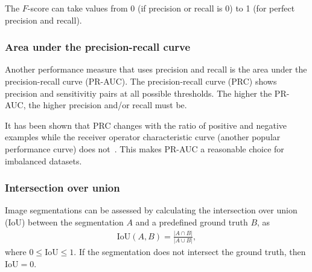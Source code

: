 The $F$-score can take values from 0 (if precision or recall is 0) to 1 (for perfect precision and recall).

\subsubsection{Area under the precision-recall curve}
Another performance measure that uses precision and recall is the area under the precision-recall curve (PR-AUC).
The precision-recall curve (PRC) shows precision and sensitivitiy pairs at all possible thresholds.
The higher the PR-AUC, the higher precision and/or recall must be.

It has been shown that PRC changes with the ratio of positive and negative examples while the receiver operator characteristic curve (another popular performance curve) does not~\cite{Takaya2015}.
This makes PR-AUC a reasonable choice for imbalanced datasets.

\subsubsection{Intersection over union}
Image segmentations can be assessed by calculating the intersection over union (IoU) between the segmentation $A$ and a predefined ground truth $B$, as
\begin{align}
    \mathrm{IoU}(A, B) = \frac{|A \cap B|}{|A \cup B|},
\end{align}
where $0 \leq \mathrm{IoU} \leq 1$.
If the segmentation does not intersect the ground truth, then $\mathrm{IoU} = 0$.

